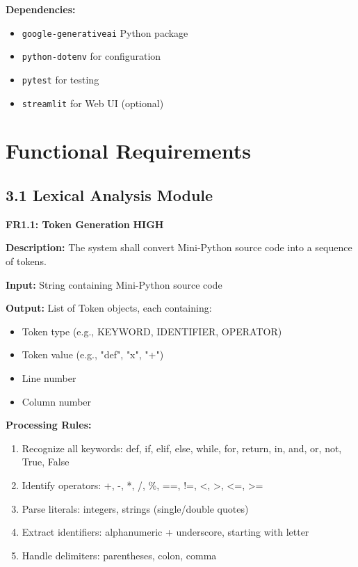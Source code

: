 \documentclass[a4paper,11pt]{article}
\newcommand{\priority}[1]{\colorbox{red!20}{\textbf{#1}}}
\begin{document}
\textbf{Dependencies:}
\begin{itemize}
    \item \texttt{google-generativeai} Python package
    \item \texttt{python-dotenv} for configuration
    \item \texttt{pytest} for testing
    \item \texttt{streamlit} for Web UI (optional)
\end{itemize}

\clearpage

\section{Functional Requirements}

\subsection{3.1 Lexical Analysis Module}

\textbf{FR1.1: Token Generation} \priority{HIGH}

\textbf{Description:} The system shall convert Mini-Python source code into a sequence of tokens.

\textbf{Input:} String containing Mini-Python source code

\textbf{Output:} List of Token objects, each containing:
\begin{itemize}
    \item Token type (e.g., KEYWORD, IDENTIFIER, OPERATOR)
    \item Token value (e.g., "def", "x", "+")
    \item Line number
    \item Column number
\end{itemize}

\textbf{Processing Rules:}
\begin{enumerate}
    \item Recognize all keywords: def, if, elif, else, while, for, return, in, and, or, not, True, False
    \item Identify operators: +, -, *, /, \%, ==, !=, <, >, <=, >=
    \item Parse literals: integers, strings (single/double quotes)
    \item Extract identifiers: alphanumeric + underscore, starting with letter
    \item Handle delimiters: parentheses, colon, comma
\end{enumerate}
\end{document}
